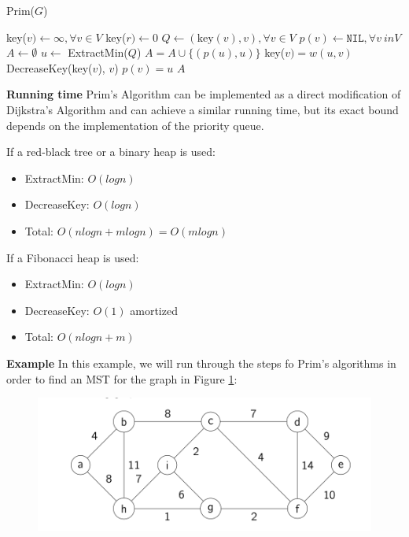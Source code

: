 \documentclass [12pt]{article}
\theoremstyle{definition}
\begin{document}
\begin{algorithm}
\caption{Prim($G$)}
\label{alg:prims_algorithm}
\begin{algorithmic}
\State key($v) \gets \infty, \forall v \in V$
\State key($r) \gets 0$
\State $Q \gets (\text{key}(v), v), \forall v \in V$
\State $p(v) \gets \texttt{NIL}, \forall v \ in V$
\State $A \gets \emptyset$
\State {} {
    \State $u \gets $ ExtractMin($Q$)
    \State {} {
        \State $A = A \cup \{(p(u),u) \}$
    }
    \State {} {
        \State {} {
            \State key($v) = w(u,v)$
            \State DecreaseKey(key($v$), $v$)
            \State $p(v) = u$
        }
    }
}
\State \Return $A$
\end{algorithmic}
\end{algorithm}

\textbf{Running time} Prim's Algorithm can be implemented as a direct modification of Dijkstra's Algorithm and can achieve a similar running time, but its exact bound depends on the implementation of the priority queue.

If a red-black tree or a binary heap is used:
\begin{itemize}
    \item ExtractMin: $O(log n)$
    \item DecreaseKey: $O(log n)$
    \item Total: $O(n log n + m log n) = O(m log n)$
\end{itemize}

If a Fibonacci heap is used:
\begin{itemize}
    \item ExtractMin: $O(log n)$
    \item DecreaseKey: $O(1)$ amortized
    \item Total: $O(n log n + m)$
\end{itemize}

\textbf{Example} In this example, we will run through the steps fo Prim's algorithms in order to find an MST for the graph in Figure \ref{fig:prims_1}:

\begin{figure}[h!]
\centering
\includegraphics[scale=0.8]{prims_1.png}
\caption{}
\label{fig:prims_1}
\end{figure}
\end{document}
